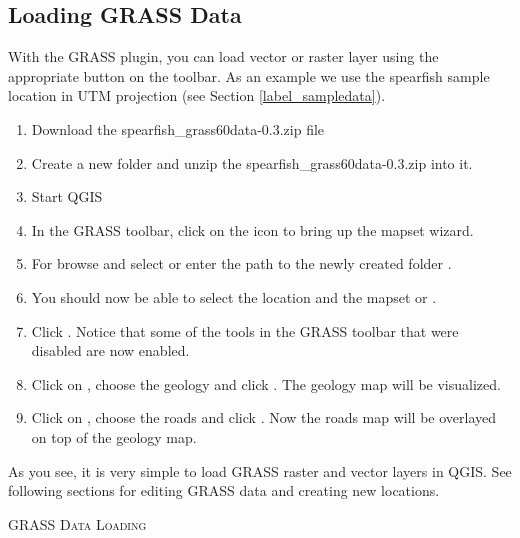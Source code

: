 \subsection{Loading GRASS Data}\label{sec:load_grassdata}

With the GRASS plugin, you can load vector or raster layer using the appropriate button 
on the toolbar. As an example we use the spearfish sample location in UTM projection 
(see Section \ref{label_sampledata}).

\begin{enumerate}
  \item Download the spearfish\_grass60data-0.3.zip file
  \item Create a new folder  and unzip the spearfish\_grass60data-0.3.zip into it. 
  \item Start QGIS
  \item In the GRASS toolbar, click on the  icon to bring up the mapset wizard.
  \item For  browse and select or enter the path to the newly
  created folder .
  \item You should now be able to select the location 
  and the mapset  or . 
  \item Click . Notice that some of the tools in the GRASS toolbar
  that were disabled are now enabled.
  \item Click on , choose
  the  geology and click . The geology map will be visualized. 
  \item Click on , choose
  the  roads and click . Now the roads map will
  be overlayed on top of the geology map.  
\end{enumerate}

As you see, it is very simple to load GRASS raster and vector layers in QGIS. See following sections 
for editing GRASS data and creating new locations.

\begin{Tip}\caption{\textsc{GRASS Data Loading}}
\end{Tip} 

